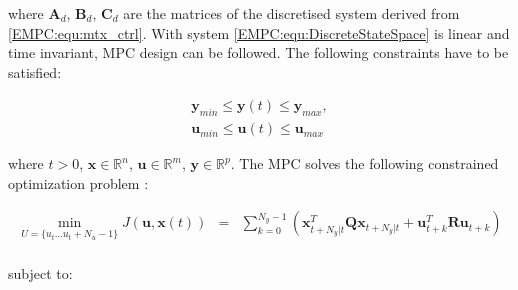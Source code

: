     where $\textbf{A}_d$, $\textbf{B}_d$, $\textbf{C}_d$ are the matrices of the discretised system derived from \ref{EMPC:equ:mtx_ctrl}. With system \ref{EMPC:equ:DiscreteStateSpace} is linear and time invariant, MPC design can be followed. The following constraints have to be satisfied:

    \begin{equation}
        \begin{array}{r}
            \textbf{y}_{min}\leq\textbf{y}(t)\leq\textbf{y}_{max},\\
            \textbf{u}_{min}\leq\textbf{u}(t)\leq\textbf{u}_{max}
        \end{array}
        \label{EMPC:equ:contraint_desc}
    \end{equation}

    where $t>0$, $\textbf{x}\in \mathbb{R}^n$, $\textbf{u}\in \mathbb{R}^m$, $\textbf{y}\in \mathbb{R}^p$. The MPC solves the following constrained optimization problem \cite{rivera2013predictive}:

    \begin{equation}
        \begin{array}{rcl}
           \displaystyle \min_{U=\{u_t\dots u_t+N_u-1\}}J(\textbf{u},\textbf{x}(t))&=&\sum^{N_y-1}_{k=0}(\textbf{x}^T_{t+N_y|t}\textbf{Q}\textbf{x}_{t+N_y|t}+
           \textbf{u}^T_{t+k}\textbf{R}\textbf{u}_{t+k})\\
        \end{array}
        \label{EMPC:equ:optim_problem}
    \end{equation}

    subject to:

